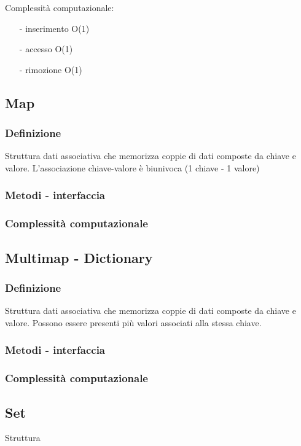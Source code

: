 \documentclass{article}
\begin{document}
Complessità computazionale:
\begin{itemize} [topsep=3pt, itemsep=0pt]
	\item[-] inserimento O(1)
	\item[-] accesso O(1)
	\item[-] rimozione O(1)
\end{itemize}


\subsection{Map}
\subsubsection*{Definizione}
Struttura dati associativa che memorizza coppie di dati composte da chiave e valore.
L'associazione chiave-valore è biunivoca (1 chiave - 1 valore)

\subsubsection*{Metodi - interfaccia}

\subsubsection*{Complessità computazionale}

\subsection{Multimap - Dictionary}
\subsubsection*{Definizione}
Struttura dati associativa che memorizza coppie di dati composte da chiave e valore.
Possono essere presenti più valori associati alla stessa chiave.

\subsubsection*{Metodi - interfaccia}
\subsubsection*{Complessità computazionale}

\subsection{Set}
Struttura 
\end{document}
